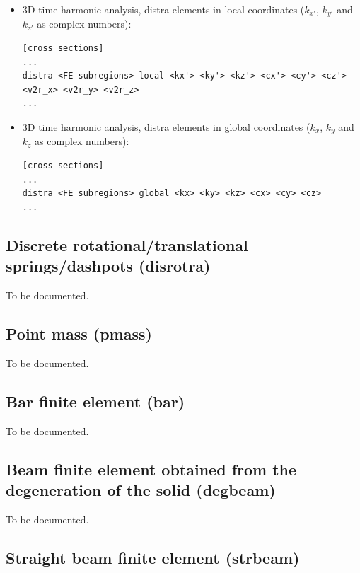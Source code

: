 \documentclass[a4paper,fleqn]{book}
\begin{document}
\begin{itemize}
\item 3D time harmonic analysis, distra elements in local coordinates ($k_{x'}$, $k_{y'}$ and $k_{z'}$ as complex numbers):
\begin{Verbatim}[frame=single, fontsize=\small, label={format of section [cross sections] for distra elements}]
[cross sections]
...
distra <FE subregions> local <kx'> <ky'> <kz'> <cx'> <cy'> <cz'> <v2r_x> <v2r_y> <v2r_z>
...
\end{Verbatim}

\item 3D time harmonic analysis, distra elements in global coordinates ($k_{x}$, $k_{y}$ and $k_{z}$ as complex numbers):
\begin{Verbatim}[frame=single, fontsize=\small, label={format of section [cross sections] for distra elements}]
[cross sections]
...
distra <FE subregions> global <kx> <ky> <kz> <cx> <cy> <cz>
...
\end{Verbatim}

\end{itemize}

\subsection{Discrete rotational/translational springs/dashpots (disrotra)}

To be documented.

\subsection{Point mass (pmass)}

To be documented.

\subsection{Bar finite element (bar)}

To be documented.

\subsection{Beam finite element obtained from the degeneration of the solid (degbeam)}

To be documented.

\subsection{Straight beam finite element (strbeam)}
\end{document}
